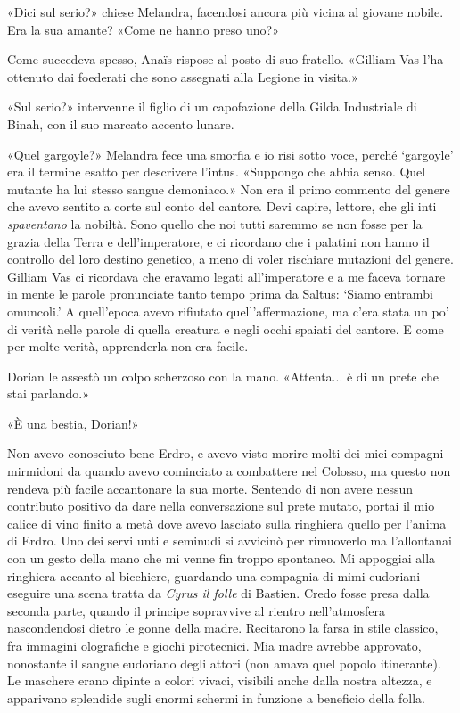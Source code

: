 «Dici sul serio?» chiese Melandra, facendosi ancora più vicina al
giovane nobile. Era la sua amante? «Come ne hanno preso uno?»

Come succedeva spesso, Anaïs rispose al posto di suo fratello. «Gilliam
Vas l'ha ottenuto dai foederati che sono assegnati alla Legione in
visita.»

«Sul serio?» intervenne il figlio di un capofazione della Gilda
Industriale di Binah, con il suo marcato accento lunare.

«Quel gargoyle?» Melandra fece una smorfia e io risi sotto voce, perché
`gargoyle' era il termine esatto per descrivere l'intus\emph{.}
«Suppongo che abbia senso. Quel mutante ha lui stesso sangue demoniaco.»
Non era il primo commento del genere che avevo sentito a corte sul conto
del cantore. Devi capire, lettore, che gli inti \emph{spaventano} la
nobiltà. Sono quello che noi tutti saremmo se non fosse per la grazia
della Terra e dell'imperatore, e ci ricordano che i palatini non hanno
il controllo del loro destino genetico, a meno di voler rischiare
mutazioni del genere. Gilliam Vas ci ricordava che eravamo legati
all'imperatore e a me faceva tornare in mente le parole pronunciate
tanto tempo prima da Saltus: `Siamo entrambi omuncoli.' A quell'epoca
avevo rifiutato quell'affermazione, ma c'era stata un po' di verità
nelle parole di quella creatura e negli occhi spaiati del cantore. E
come per molte verità, apprenderla non era facile.

Dorian le assestò un colpo scherzoso con la mano. «Attenta... è di un
prete che stai parlando.»

«È una bestia, Dorian!»

Non avevo conosciuto bene Erdro, e avevo visto morire molti dei miei
compagni mirmidoni da quando avevo cominciato a combattere nel Colosso,
ma questo non rendeva più facile accantonare la sua morte. Sentendo di
non avere nessun contributo positivo da dare nella conversazione sul
prete mutato, portai il mio calice di vino finito a metà dove avevo
lasciato sulla ringhiera quello per l'anima di Erdro. Uno dei servi unti
e seminudi si avvicinò per rimuoverlo ma l'allontanai con un gesto della
mano che mi venne fin troppo spontaneo. Mi appoggiai alla ringhiera
accanto al bicchiere, guardando una compagnia di mimi eudoriani eseguire
una scena tratta da \emph{Cyrus il folle} di Bastien. Credo fosse presa
dalla seconda parte, quando il principe sopravvive al rientro
nell'atmosfera nascondendosi dietro le gonne della madre. Recitarono la
farsa in stile classico, fra immagini olografiche e giochi pirotecnici.
Mia madre avrebbe approvato, nonostante il sangue eudoriano degli attori
(non amava quel popolo itinerante). Le maschere erano dipinte a colori
vivaci, visibili anche dalla nostra altezza, e apparivano splendide
sugli enormi schermi in funzione a beneficio della folla.

